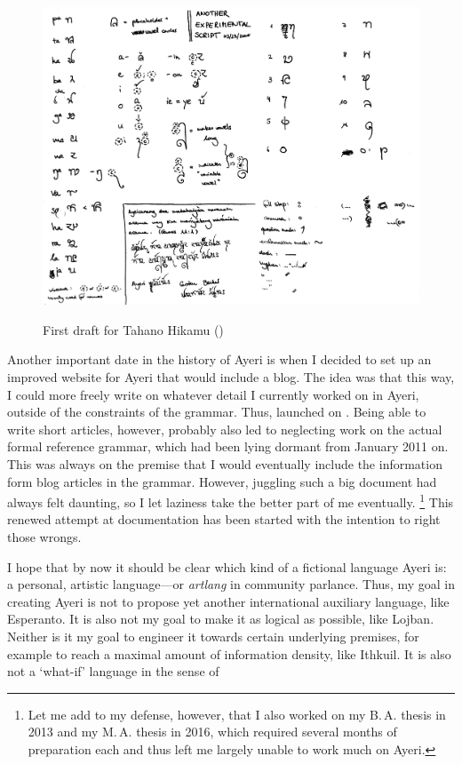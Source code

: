 \begin{figure}[tph]
	\centering
	\caption[First draft for Tahano Hikamu]{First draft for Tahano Hikamu ()}
	\includegraphics[width=\textwidth, keepaspectratio]{images/th2005-300dpi-bw.png}
	\label{fig:th2005}
\end{figure}

Another important date in the history of Ayeri is when I decided to set up an 
improved website for Ayeri that would include a blog. The idea was that this 
way, I could more freely write on whatever detail I currently worked on in 
Ayeri, outside of the constraints of the grammar. Thus,  launched on . Being able to write short 
articles, however, probably also led to neglecting work on the actual formal 
reference grammar, which had been lying dormant from January 2011 on. This was 
always on the premise that I would eventually include the information form 
blog articles in the grammar. However, juggling such a big document had always 
felt daunting, so I let laziness take the better part of me eventually.%
\footnote{Let me add to my defense, however, that I also worked on my B.\,A. 
thesis in 2013 and my M.\,A. thesis in 2016, which required several months of 
preparation each and thus left me largely unable to work much on Ayeri.} This 
renewed attempt at documentation has been started with the intention to right 
those wrongs.

I hope that by now it should be clear which kind of a fictional language Ayeri 
is: a personal, artistic language---or \emph{artlang} in community parlance.
Thus, my goal in creating Ayeri is not to propose yet another international 
auxiliary language, like Esperanto. It is also not my goal to make it as logical 
as possible, like Lojban. Neither is it my goal to engineer it towards certain 
underlying premises, for example to reach a maximal amount of information 
density, like Ithkuil. It is also not a `what-if' language in the sense of 

